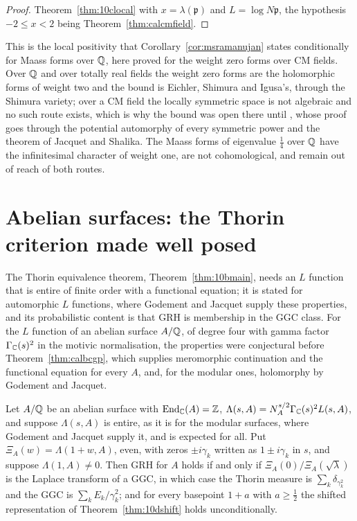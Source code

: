 \begin{proof}
Theorem~\ref{thm:10clocal} with $x=\lambda(\mathfrak p)$ and $L=\log N\mathfrak p$, the hypothesis $-2\le x<2$ being Theorem~\ref{thm:calcmfield}.
\end{proof}

This is the local positivity that Corollary~\ref{cor:msramanujan} states conditionally for Maass forms over $\mathbb{Q}$, here proved for the weight zero forms over CM fields. Over $\mathbb{Q}$ and over totally real fields the weight zero forms are the holomorphic forms of weight two and the bound is Eichler, Shimura and Igusa's, through the Shimura variety; over a CM field the locally symmetric space is not algebraic and no such route exists, which is why the bound was open there until \cite{accghlnstt2023}, whose proof goes through the potential automorphy of every symmetric power and the theorem of Jacquet and Shalika. The Maass forms of eigenvalue $\frac14$ over $\mathbb{Q}$ have the infinitesimal character of weight one, are not cohomological, and remain out of reach of both routes.

\section{Abelian surfaces: the Thorin criterion made well posed}\label{sec:calg2}

The Thorin equivalence theorem, Theorem~\ref{thm:10bmain}, needs an $L$ function that is entire of finite order with a functional equation; it is stated for automorphic $L$ functions, where Godement and Jacquet supply these properties, and its probabilistic content is that GRH is membership in the GGC class. For the $L$ function of an abelian surface $A/\mathbb{Q}$, of degree four with gamma factor $\Gamma_{\mathbb{C}}(s)^2$ in the motivic normalisation, the properties were conjectural before Theorem~\ref{thm:calbcgp}, which supplies meromorphic continuation and the functional equation for every $A$, and, for the modular ones, holomorphy by Godement and Jacquet.

\begin{theorem}\label{thm:calg2}
Let $A/\mathbb{Q}$ be an abelian surface with $\operatorname{End}_{\mathbb{C}}(A)=\mathbb{Z}$, $\Lambda(s,A)=N_A^{s/2}\Gamma_{\mathbb{C}}(s)^2L(s,A)$, and suppose $\Lambda(s,A)$ is entire, as it is for the modular surfaces, where Godement and Jacquet supply it, and is expected for all. Put $\Xi_A(w)=\Lambda(1+w,A)$, even, with zeros $\pm i\gamma_k$ written as $1\pm i\gamma_k$ in $s$, and suppose $\Lambda(1,A)\ne0$. Then GRH for $A$ holds if and only if $\Xi_A(0)/\Xi_A(\sqrt\lambda)$ is the Laplace transform of a GGC, in which case the Thorin measure is $\sum_k\delta_{\gamma_k^2}$ and the GGC is $\sum_kE_k/\gamma_k^2$; and for every basepoint $1+a$ with $a\ge\frac12$ the shifted representation of Theorem~\ref{thm:10dshift} holds unconditionally.
\end{theorem}

